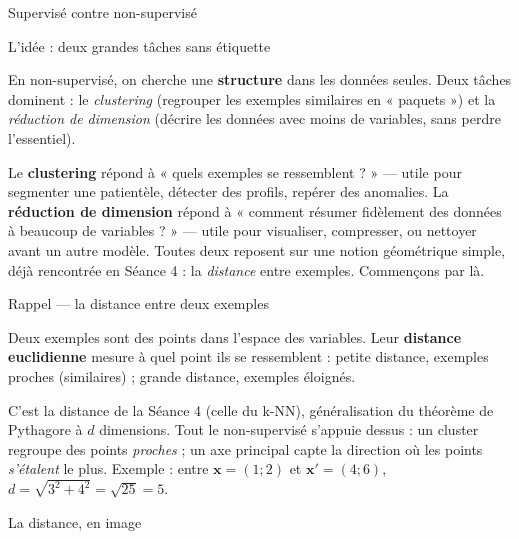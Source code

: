 \documentclass[aspectratio=169,11pt]{beamer}
\newcommand{\vx}{\mathbf{x}}
\begin{document}
\begin{frame}{Supervisé contre non-supervisé}
\end{frame}

\begin{frame}{L'idée : deux grandes tâches sans étiquette}
\begin{ucaddef}
{\small En non-supervisé, on cherche une \textbf{structure} dans les données seules. Deux tâches dominent : le \emph{clustering} (regrouper les exemples similaires en « paquets ») et la \emph{réduction de dimension} (décrire les données avec moins de variables, sans perdre l'essentiel).}
\end{ucaddef}
{\small Le \textbf{clustering} répond à « quels exemples se ressemblent ? » — utile pour segmenter une patientèle, détecter des profils, repérer des anomalies. La \textbf{réduction de dimension} répond à « comment résumer fidèlement des données à beaucoup de variables ? » — utile pour visualiser, compresser, ou nettoyer avant un autre modèle. Toutes deux reposent sur une notion géométrique simple, déjà rencontrée en Séance 4 : la \emph{distance} entre exemples. Commençons par là.}
\end{frame}

\begin{frame}{Rappel — la distance entre deux exemples}
\begin{ucaddef}[Définition]
{\small Deux exemples sont des points dans l'espace des variables. Leur \textbf{distance euclidienne} mesure à quel point ils se ressemblent : petite distance, exemples proches (similaires) ; grande distance, exemples éloignés.}
\end{ucaddef}
\ucadformula{d(\vx, \vx') = \sqrt{\sum_{j=1}^{d}(x_j - x'_j)^2}}
{\small C'est la distance de la Séance 4 (celle du k-NN), généralisation du théorème de Pythagore à $d$ dimensions. Tout le non-supervisé s'appuie dessus : un cluster regroupe des points \emph{proches} ; un axe principal capte la direction où les points \emph{s'étalent} le plus. Exemple : entre $\vx = (1; 2)$ et $\vx' = (4; 6)$, $d = \sqrt{3^2 + 4^2} = \sqrt{25} = 5$.}
\end{frame}

\begin{frame}{La distance, en image}
\end{frame}
\end{document}
